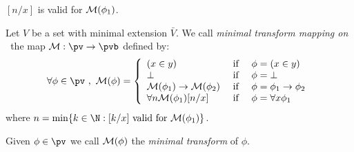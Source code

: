 $[n/x]$ is valid for ${\cal M}(\phi_{1})$.
\begin{defin}\label{logic:def:FOPL:mintransform:transform}
Let $V$ be a set with minimal extension $\bar{V}$. We call {\em
minimal transform mapping on \pv\ }the map ${\cal M}:\pv\to\pvb$
defined by:
\begin{equation}\label{logic:eqn:FOPL:mintransform:transform}
    \forall\phi\in\pv\ ,\ {\cal M}(\phi)=\left\{
                    \begin{array}{lcl}
                    (x\in y)&\mbox{\ if\ }&\phi=(x\in y)\\
                    \bot&\mbox{\ if\ }&\phi=\bot\\
                    {\cal M}(\phi_{1})\to{\cal M}(\phi_{2})&\mbox{\ if\ }&
                    \phi=\phi_{1}\to\phi_{2}\\
                    \forall n{\cal M}(\phi_{1})[n/x]&\mbox{\ if\ }&\phi=\forall x\phi_{1}\\
                    \end{array}\right.
    \end{equation}
where $n=\min\{k\in\N:\mbox{$[k/x]$ valid for ${\cal
M}(\phi_{1})$}\}$.
\end{defin}
Given $\phi\in\pv$ we call ${\cal M}(\phi)$ the {\em minimal
transform} of $\phi$.

